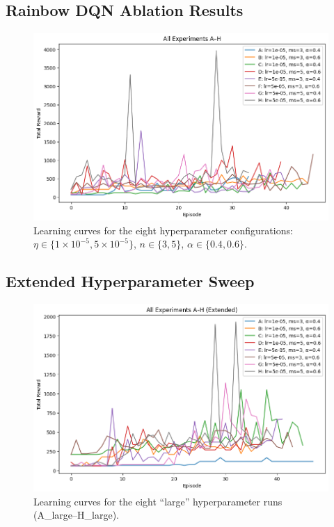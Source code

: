 \documentclass{article}
\begin{document}
\subsection{Rainbow DQN Ablation Results}
\begin{figure}[htbp]
  \centering
  \includegraphics[width=0.8\linewidth]{rainbow_8Regular.png}
  \caption{Learning curves for the eight hyperparameter configurations:
           \(\eta\in\{1\times10^{-5},5\times10^{-5}\}\), 
           \(n\in\{3,5\}\), 
           \(\alpha\in\{0.4,0.6\}\).}
  \label{fig:ablation}
\end{figure}

\subsection{Extended Hyperparameter Sweep}
\begin{figure}[htbp]
  \centering
  \includegraphics[width=0.9\linewidth]{rainbow_8Extended.png}
  \caption{Learning curves for the eight “large” hyperparameter runs (A\_large–H\_large).}
  \label{fig:extended_sweep}
\end{figure}
\end{document}

